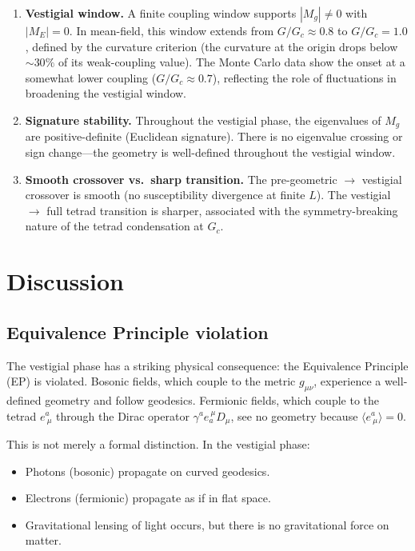 \documentclass[aps,prd,twocolumn,superscriptaddress,nofootinbib]{revtex4-2}
\newcommand{\vev}[1]{\langle #1 \rangle}
\newcommand{\Gc}{G_c}
\begin{document}
\begin{enumerate}
\item \textbf{Vestigial window.} A finite coupling window supports
  $|M_g| \neq 0$ with $|M_E| = 0$. In mean-field, this window extends
  from $G/\Gc \approx 0.8$ to $G/\Gc = 1.0$, defined by the curvature
  criterion (the curvature at the origin drops below $\sim 30\%$ of its
  weak-coupling value). The Monte Carlo data show the onset at a somewhat
  lower coupling ($G/\Gc \approx 0.7$), reflecting the role of
  fluctuations in broadening the vestigial window.

\item \textbf{Signature stability.} Throughout the vestigial phase, the
  eigenvalues of $M_g$ are positive-definite (Euclidean signature).
  There is no eigenvalue crossing or sign change---the geometry is
  well-defined throughout the vestigial window.

\item \textbf{Smooth crossover vs.\ sharp transition.} The
  pre-geometric $\to$ vestigial crossover is smooth (no susceptibility
  divergence at finite $L$). The vestigial $\to$ full tetrad transition
  is sharper, associated with the symmetry-breaking nature of the tetrad
  condensation at $\Gc$.
\end{enumerate}


\section{Discussion}
\label{sec:discussion}

\subsection{Equivalence Principle violation}

The vestigial phase has a striking physical consequence: the Equivalence
Principle (EP) is violated. Bosonic fields, which couple to the metric
$g_{\mu\nu}$, experience a well-defined geometry and follow geodesics.
Fermionic fields, which couple to the tetrad $e^a_{\ \mu}$ through the
Dirac operator $\gamma^a e_a^{\ \mu} D_\mu$, see no geometry because
$\vev{e^a_{\ \mu}} = 0$.

This is not merely a formal distinction. In the vestigial phase:
\begin{itemize}
\item Photons (bosonic) propagate on curved geodesics.
\item Electrons (fermionic) propagate as if in flat space.
\item Gravitational lensing of light occurs, but there is no gravitational
  force on matter.
\end{itemize}
\end{document}
